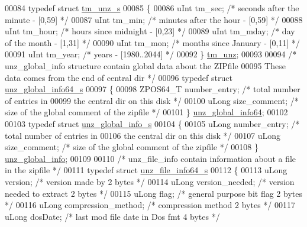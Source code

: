 \begin{DoxyCode}
00084 \textcolor{keyword}{typedef} \textcolor{keyword}{struct }\hyperlink{structtm__unz__s}{tm\_unz\_s}
00085 \{
00086     uInt tm\_sec;            \textcolor{comment}{/* seconds after the minute - [0,59] */}
00087     uInt tm\_min;            \textcolor{comment}{/* minutes after the hour - [0,59] */}
00088     uInt tm\_hour;           \textcolor{comment}{/* hours since midnight - [0,23] */}
00089     uInt tm\_mday;           \textcolor{comment}{/* day of the month - [1,31] */}
00090     uInt tm\_mon;            \textcolor{comment}{/* months since January - [0,11] */}
00091     uInt tm\_year;           \textcolor{comment}{/* years - [1980..2044] */}
00092 \} \hyperlink{structtm__unz__s}{tm\_unz};
00093 
00094 \textcolor{comment}{/* unz\_global\_info structure contain global data about the ZIPfile}
00095 \textcolor{comment}{   These data comes from the end of central dir */}
00096 \textcolor{keyword}{typedef} \textcolor{keyword}{struct }\hyperlink{structunz__global__info64__s}{unz\_global\_info64\_s}
00097 \{
00098     ZPOS64\_T number\_entry;         \textcolor{comment}{/* total number of entries in}
00099 \textcolor{comment}{                                     the central dir on this disk */}
00100     uLong size\_comment;         \textcolor{comment}{/* size of the global comment of the zipfile */}
00101 \} \hyperlink{structunz__global__info64__s}{unz\_global\_info64};
00102 
00103 \textcolor{keyword}{typedef} \textcolor{keyword}{struct }\hyperlink{structunz__global__info__s}{unz\_global\_info\_s}
00104 \{
00105     uLong number\_entry;         \textcolor{comment}{/* total number of entries in}
00106 \textcolor{comment}{                                     the central dir on this disk */}
00107     uLong size\_comment;         \textcolor{comment}{/* size of the global comment of the zipfile */}
00108 \} \hyperlink{structunz__global__info__s}{unz\_global\_info};
00109 
00110 \textcolor{comment}{/* unz\_file\_info contain information about a file in the zipfile */}
00111 \textcolor{keyword}{typedef} \textcolor{keyword}{struct }\hyperlink{structunz__file__info64__s}{unz\_file\_info64\_s}
00112 \{
00113     uLong version;              \textcolor{comment}{/* version made by                 2 bytes */}
00114     uLong version\_needed;       \textcolor{comment}{/* version needed to extract       2 bytes */}
00115     uLong flag;                 \textcolor{comment}{/* general purpose bit flag        2 bytes */}
00116     uLong compression\_method;   \textcolor{comment}{/* compression method              2 bytes */}
00117     uLong dosDate;              \textcolor{comment}{/* last mod file date in Dos fmt   4 bytes */}

\end{DoxyCode}
